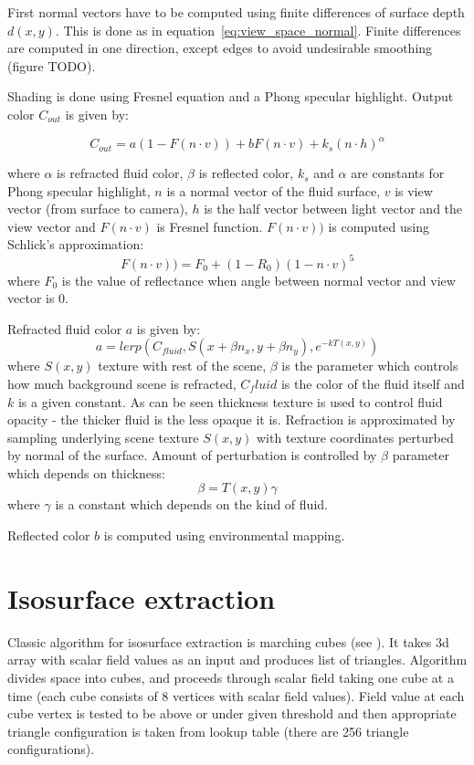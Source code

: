First normal vectors have to be computed using finite differences of surface depth $d(x, y)$. This is done as in equation~\ref{eq:view_space_normal}. Finite differences are computed in one direction, except edges to avoid undesirable smoothing (figure TODO). 

Shading is done using Fresnel equation and a Phong specular highlight. Output color $C_{out}$ is given by:

\begin{equation}
\label{shading_equation}
C_{out} = a (1 - F(n \cdot v)) + b F(n \cdot v) + k_s (n \cdot h)^{\alpha}
\end{equation}

where $\alpha$ is refracted fluid color, $\beta$ is reflected color, $k_s$ and $\alpha$ are constants for Phong specular highlight, $n$ is a normal vector of the fluid surface, $v$ is view vector (from surface to camera), $h$ is the half vector between light vector and the view vector and $F(n \cdot v)$ is Fresnel function. 
$F(n \cdot v))$ is computed using Schlick's approximation:
\begin{equation}
F(n \cdot v)) = F_0 + (1 - R_0)(1 - n \cdot v)^5
\end{equation}
where $F_0$ is the value of reflectance when angle between normal vector and view vector is 0. 

Refracted fluid color $a$ is given by:
\begin{equation}
\label{refracted_color}
a = lerp(C_{fluid}, S(x + \beta n_x, y + \beta n_y), e^{-k T(x, y)})
\end{equation}
where $S(x, y)$ texture with rest of the scene, $\beta$ is the parameter which controls how much background scene is refracted, $C_fluid$ is the color of the fluid itself and $k$ is a given constant. As can be seen thickness texture is used to control fluid opacity - the thicker fluid is the less opaque it is. Refraction is approximated by sampling underlying scene texture $S(x, y)$ with texture coordinates perturbed by normal of the surface. Amount of perturbation is controlled by $\beta$ parameter which depends on thickness:
\begin{equation}
\beta = T(x, y) \gamma
\end{equation}
where $\gamma$ is a constant which depends on the kind of fluid. 

Reflected color $b$ is computed using environmental mapping. 

\section{Isosurface extraction} \label{sec:isosurfaceextraction}
Classic algorithm for isosurface extraction is marching cubes (see \cite{LorensenCline1987}). It takes 3d array with scalar field values as an input and produces list of triangles. Algorithm divides space into cubes, and proceeds through scalar field taking one cube at a time (each cube consists of 8 vertices with scalar field values). Field value at each cube vertex is tested to be above or under given threshold and then appropriate triangle configuration is taken from lookup table (there are 256 triangle configurations).

